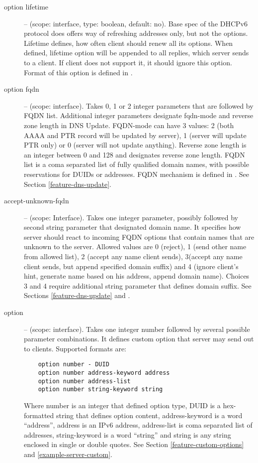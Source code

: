 \begin{description}
 \item[option lifetime] -- (scope: interface, type: boolean, default:
   no). Base spec of the DHCPv6 protocol does offers way of refreshing
   addresses only, but not the options. Lifetime defines, how often
   client should renew all its options. When defined, lifetime option
   will be appended to all replies, which server sends to a client. If
   client does not support it, it should ignore this option. Format of
   this option is defined in \cite{rfc4242}.

 \item[option fqdn] -- (scope: interface). Takes 0, 1 or 2 integer
   parameters that are followed by FQDN list. Additional integer
   parameters designate fqdn-mode and reverse zone length in DNS
   Update. FQDN-mode can have 3 values: 2 (both AAAA and PTR record
   will be updated by server), 1 (server will update PTR only) or 
   0 (server will not update anything). Reverse zone length is an
   integer between 0 and 128 and designates reverse zone length. FQDN
   list is a coma separated list of fully qualified domain names, with
   possible reservations for DUIDs or addresses. FQDN mechanism is
   defined in \cite{rfc4704}. See Section \ref{feature-dns-update}.
   
\item[accept-unknown-fqdn] -- (scope: Interface). Takes one integer
  parameter, possibly followed by second string parameter that
  designated domain name. It specifies how server should react to
  incoming FQDN options that contain names that are unknown to the
  server. Allowed values are 0 (reject), 1 (send other name from
  allowed list), 2 (accept any name client sends), 3(accept any name
  client sends, but append specified domain suffix) and 4 (ignore
  client's hint, generate name based on his address, append domain
  name). Choices 3 and 4 require additional string parameter that
  defines domain suffix. See Sections \ref{feature-dns-update}
  and \label{example-server-fqdn}.
 
\item[option] -- (scope: interface). Takes one integer number followed
  by several possible parameter combinations. It defines custom
  option that server may send out to clients. Supported formats are:
  \begin{lstlisting}
    option number - DUID
    option number address-keyword address
    option number address-list
    option number string-keyword string
  \end{lstlisting}
Where number is an integer that defined option type, DUID is a
hex-formatted string that defines option content, address-keyword is a
word ``address'', address is an IPv6 address, address-list is coma
separated list of addresses, string-keyword is a word ``string'' and
string is any string enclosed in single or double quotes. See Section
\ref{feature-custom-options} and \ref{example-server-custom}.


\end{description}
